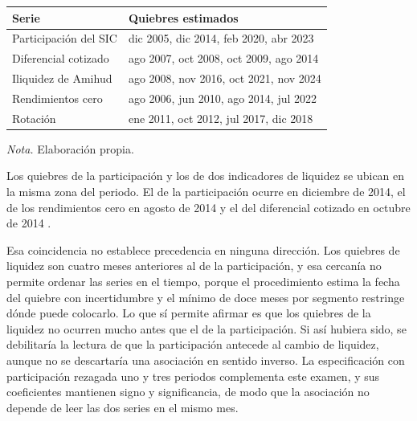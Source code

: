 

{\small
\begin{longtable}[]{@{}
  >{\raggedright\arraybackslash}p{}
  >{\raggedright\arraybackslash}p{}@{}}
\toprule\noalign{}
\begin{minipage}[b]{\linewidth}\raggedright
\textbf{Serie}
\end{minipage} & \begin{minipage}[b]{\linewidth}\raggedright
\textbf{Quiebres estimados}
\end{minipage} \\
\midrule\noalign{}
\endhead
\bottomrule\noalign{}
\endlastfoot
Participación del SIC & dic 2005, dic 2014, feb 2020, abr 2023 \\
Diferencial cotizado & ago 2007, oct 2008, oct 2009, ago 2014 \\
Iliquidez de Amihud & ago 2008, nov 2016, oct 2021, nov 2024 \\
Rendimientos cero & ago 2006, jun 2010, ago 2014, jul 2022 \\
Rotación & ene 2011, oct 2012, jul 2017, dic 2018 \\
\end{longtable}
}

\emph{Nota.} Elaboración propia.

Los quiebres de la participación y los de dos indicadores de liquidez se ubican en la misma zona del periodo. El de la participación ocurre en diciembre de 2014, el de los rendimientos cero en agosto de 2014 y el del diferencial cotizado en octubre de 2014 .

Esa coincidencia no establece precedencia en ninguna dirección. Los quiebres de liquidez son cuatro meses anteriores al de la participación, y esa cercanía no permite ordenar las series en el tiempo, porque el procedimiento estima la fecha del quiebre con incertidumbre y el mínimo de doce meses por segmento restringe dónde puede colocarlo. Lo que sí permite afirmar es que los quiebres de la liquidez no ocurren mucho antes que el de la participación. Si así hubiera sido, se debilitaría la lectura de que la participación antecede al cambio de liquidez, aunque no se descartaría una asociación en sentido inverso. La especificación con participación rezagada uno y tres periodos complementa este examen, y sus coeficientes mantienen signo y significancia, de modo que la asociación no depende de leer las dos series en el mismo mes.

